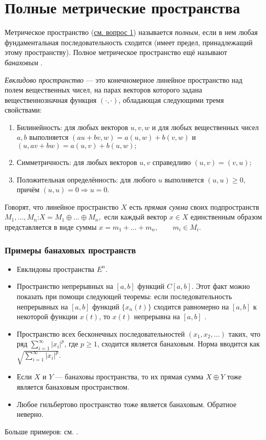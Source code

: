 \section{Полные метрические пространства}
\label{sec:q-2}
Метрическое пространство (\hyperref[sec:q-1]{см. вопрос 1}) называется \textit{полным}, если в нем любая фундаментальная последовательность сходится (имеет предел, принадлежащий этому пространству). Полное метрическое пространство ещё называют \textit{банаховым} \cite[с.~42]{trenogin}.

\textit{Евклидово пространство} --- это конечномерное линейное пространство над полем вещественных чисел, на парах векторов которого задана вещественнозначная функция $(\cdot, \cdot)$, обладающая следующими тремя свойствами:
\begin{enumerate}
	\itemsep0pt
	\item Билинейность: для любых векторов $u,v,w$ и для любых вещественных чисел $a, b$ выполняется $(au+bv, w)=a(u,w)+b(v,w)$ и $(u, av+bw)=a(u,v)+b(u,w);$
	\item Симметричность: для любых векторов $u,v$ справедливо $(u,v)=(v,u);$
	\item Положительная определённость: для любого $u$ выполняется $ (u,u)\geqslant 0,$ причём $(u,u) = 0\Rightarrow u=0.$
\end{enumerate}

Говорят, что линейное пространство $X$ есть \textit{прямая сумма} своих подпространств $M_1, \dots, M_n$:$X = M_1 \oplus \dots \oplus M_n,$ если каждый вектор $x \in X$ единственным образом представляется в виде суммы
$x = m_1 + \dots + m_n, \qquad m_i \in M_i.$


\subsubsection*{Примеры банаховых пространств}
\begin{itemize}
	\itemsep0pt
	\item Евклидовы пространства $E^n$.
	\item Пространство непрерывных на $[a, b]$ функций $C[a, b]$. Этот факт можно показать при помощи следующей теоремы: если последовательность непрерывных на $[a, b]$ функций $\{x_n(t)\}$ сходится равномерно на $[a, b]$ к некоторой функции $x(t)$, то $x(t)$ непрерывна на $[a, b]$ \cite[с.~43]{trenogin}.
	\item Пространство всех бесконечных последовательностей $(x_1, x_2, \dots)$ таких, что ряд $ \sum_{i = 1}^{\infty}|x_i|^p$, где $p \geqslant 1$, сходится является банаховым. Норма вводится как $ \sqrt{\sum_{i = 1}^{\infty}|x_i|^p}$.
	\item Если $X$ и $Y$ --- банаховы пространства, то их прямая сумма $X \oplus Y$ тоже является банаховым пространством.
	\item Любое гильбертово пространство тоже является банаховым. Обратное неверно.
\end{itemize}
Больше примеров: см. \cite{wiki-banach-space}.